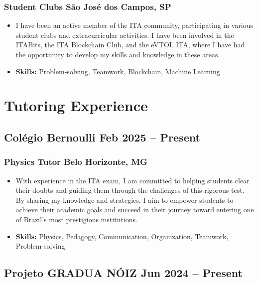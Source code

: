 \documentclass[11pt]{article}
\begin{document}
\subsubsection{ Student Clubs \hfill São José dos Campos, SP }
\vspace{10pt} %
\begin{itemize}
    \item I have been an active member of the ITA community, participating in various student clubs and extracurricular activities. I have been involved in the ITABits, the ITA Blockchain Club, and the eVTOL ITA, where I have had the opportunity to develop my skills and knowledge in these areas.
    
    \item \textbf{Skills:}  Problem-solving, Teamwork, Blockchain, Machine Learning
    
\end{itemize}


\section{Tutoring Experience}

\subsection{ Colégio Bernoulli \hfill  Feb 2025  -- Present   }
\subsubsection{ Physics Tutor \hfill Belo Horizonte, MG }
\vspace{10pt} %
\begin{itemize}
    \item With experience in the ITA exam, I am committed to helping students clear their doubts and guiding them through the challenges of this rigorous test. By sharing my knowledge and strategies, I aim to empower students to achieve their academic goals and succeed in their journey toward entering one of Brazil's most prestigious institutions.
    
    \item \textbf{Skills:}  Physics, Pedagogy, Communication, Organization, Teamwork, Problem-solving
    
\end{itemize}

\subsection{ Projeto GRADUA NÓIZ \hfill  Jun 2024  -- Present   }
\end{document}
